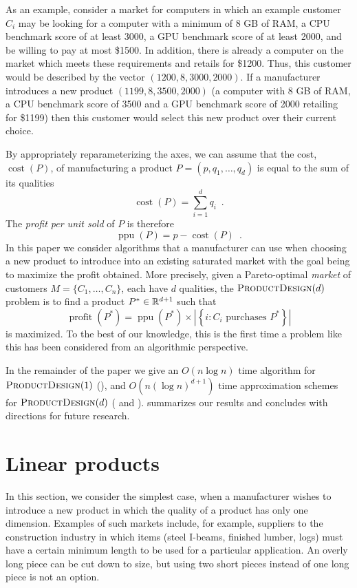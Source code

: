 \documentclass{llncs}
\newcommand{\cost}{\operatorname{cost}}
\newcommand{\ppu}{\operatorname{ppu}}
\newcommand{\val}{\operatorname{profit}}
\begin{document}
As an example, consider a market for computers in which an example customer
$C_i$ may be looking for a computer with a minimum of 8 GB of RAM, a CPU
benchmark score of at least 3000, a GPU benchmark score of at least 2000,
and be willing to pay at most \$1500.  In addition, there is already a
computer on the market which meets these requirements and retails for
\$1200.  Thus, this customer would be described by the vector
$(1200,8,3000,2000)$.  If a manufacturer introduces a new product
$(1199,8,3500,2000)$ (a computer with 8 GB of RAM, a CPU benchmark score of
3500 and a GPU benchmark score of 2000 retailing for \$1199) then this
customer would select this new product over their current choice.

By appropriately reparameterizing the axes, we can assume that the cost,
$\cost(P)$, of manufacturing a product $P=(p,q_1,\ldots,q_d)$ is equal to
the sum of its qualities
\[
   \cost(P) = \sum_{i=1}^d q_i \enspace .
\]
The \emph{profit per unit sold} of $P$ is therefore
\[
   \ppu(P) = p-\cost(P) \enspace .
\]
In this paper we consider algorithms that a manufacturer can use when
choosing a new product to introduce into an existing saturated market
with the goal being to maximize the profit obtained.  More precisely,
given a Pareto-optimal \emph{market} of customers $M=\{C_1,\ldots,C_n\}$,
each have $d$ qualities, the $\textsc{ProductDesign}(d)$ problem is to
find a product $P^*\in\mathbb{R}^{d+1}$ such that
\[
  \val(P^*) = \ppu(P^*)
    \times 
      \left| \left\{ i:\mbox{$C_i$ purchases $P^*$} \right\} \right|
\]
is maximized.  To the best of our knowledge, this is the first time a
problem like this has been considered from an algorithmic perspective.


In the remainder of the paper we give an $O(n\log n)$ time algorithm for
$\textsc{ProductDesign}(1)$ (), and $O(n(\log n)^{d+1})$ time
approximation schemes for $\textsc{ProductDesign}(d)$ (
and ).   summarizes our results and
concludes with directions for future research.


\section{Linear products}

In this section, we consider the simplest case, when a manufacturer
wishes to introduce a new product in which the quality of a product
has only one dimension.  Examples of such markets include, for example,
suppliers to the construction industry in which items (steel I-beams,
finished lumber, logs) must have a certain minimum length to be used for
a particular application.  An overly long piece can be cut down to size,
but using two short pieces instead of one long piece is not an option.
\end{document}
